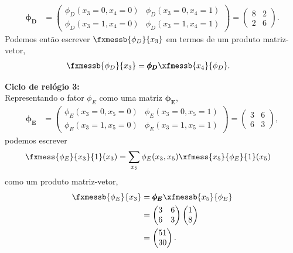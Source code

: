 \begin{exenumerate}
\begin{solution}
        \begin{align}
            \pmb{\phi_D} & = \begin{pmatrix}
                \phi_D(x_3=0,x_4=0) &  \phi_D(x_3=0,x_4=1) \\
                \phi_D(x_3=1,x_4=0) & \phi_D(x_3=1,x_4=1)  
            \end{pmatrix}
            = \begin{pmatrix}
                8 & 2 \\
                2 & 6
            \end{pmatrix}.
        \end{align}
        Podemos ent\~ao escrever $\fxmessb{\phi_D}{x_3}$ em termos de um produto matriz-vetor,
        \begin{align}
            \fxmessb{\phi_D}{x_3} & = \pmb{\phi_D} \xfmessb{x_4}{\phi_D}.
        \end{align}
        
        { \bf Ciclo de rel\'ogio 3:}\\
        Representando o fator $\phi_E$ como uma matriz $\pmb{\phi_E}$,
        \begin{align}
            \pmb{\phi_E} & = \begin{pmatrix}
                \phi_E(x_3=0,x_5=0) &  \phi_E(x_3=0,x_5=1) \\
                \phi_E(x_3=1,x_5=0) & \phi_E(x_3=1,x_5=1)  
            \end{pmatrix}
            = \begin{pmatrix}
                3 & 6 \\
                6 & 3
            \end{pmatrix},
        \end{align}
        podemos escrever
        \begin{align}
            \fxmess{\phi_E}{x_3}{1}(x_3) & = \sum_{x_5} \phi_E(x_3,x_5) \xfmess{x_5}{\phi_E}{1}(x_5)
        \end{align}
        como um produto matriz-vetor,
        \begin{align}
            \fxmessb{\phi_E}{x_3} & =  \pmb{\phi_E} \xfmessb{x_5}{\phi_E}\\
            & = \begin{pmatrix}
                3 & 6 \\
                6 & 3
            \end{pmatrix}
            \begin{pmatrix}
                1 \\
                8 \\
            \end{pmatrix}\\
            & =  \begin{pmatrix}
                51 \\
                30 \\
            \end{pmatrix}.
        \end{align}
        

\end{solution}
\end{exenumerate}
